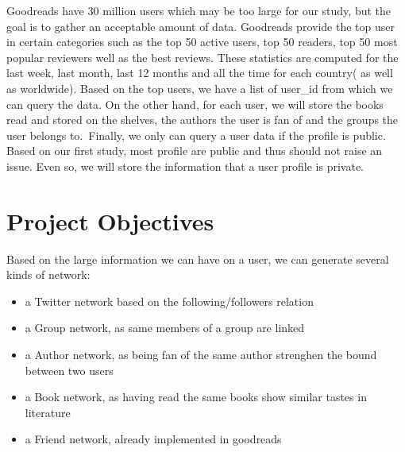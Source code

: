 \documentclass[12pt]{article}
\begin{document}
Goodreads have 30 million users which may be too large for our study, but the goal is to gather an acceptable amount of data. Goodreads provide the top user in certain categories such as the top 50 active users, top 50 readers, top 50 most popular reviewers well as the best reviews. These statistics are computed for the last week, last month, last 12 months and all the time for each country( as well as worldwide).
Based on the top users, we have a list of user\_id from which we can query the data. On the other hand, for each user, we will store the books read and stored on the shelves, the authors the user is fan of and the groups the user belongs to.\
Finally, we only can query a user data if the profile is public. Based on our first study, most profile are public and thus should not raise an issue. Even so, we will store the information that a user profile is private.


\section{Project Objectives}

Based on the large information we can have on a user, we can generate several kinds of network:
\begin{itemize}
\item a Twitter network based on the following/followers relation
\item a Group network, as same members of a group are linked
\item a Author network, as being fan of the same author strenghen the bound between two users
\item a Book network, as having read the same books show similar tastes in literature
\item a Friend network, already implemented in goodreads
\end{itemize}






\end{document}
